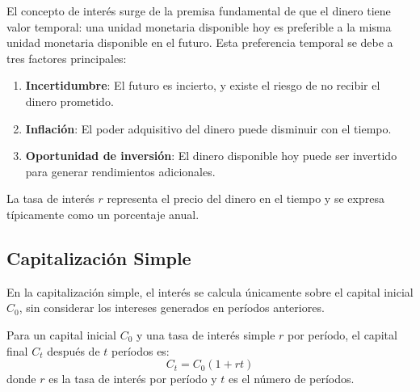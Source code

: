 El concepto de interés surge de la premisa fundamental de que el dinero tiene valor temporal: una unidad monetaria disponible hoy es preferible a la misma unidad monetaria disponible en el futuro. Esta preferencia temporal se debe a tres factores principales:

\begin{enumerate}
\item \textbf{Incertidumbre}: El futuro es incierto, y existe el riesgo de no recibir el dinero prometido.
\item \textbf{Inflación}: El poder adquisitivo del dinero puede disminuir con el tiempo.
\item \textbf{Oportunidad de inversión}: El dinero disponible hoy puede ser invertido para generar rendimientos adicionales.
\end{enumerate}

La tasa de interés $r$ representa el precio del dinero en el tiempo y se expresa típicamente como un porcentaje anual.

\begin{center}
    
\end{center}

\subsection{Capitalización Simple}

En la capitalización simple, el interés se calcula únicamente sobre el capital inicial $C_0$, sin considerar los intereses generados en períodos anteriores.

\begin{teorema}
Para un capital inicial $C_0$ y una tasa de interés simple $r$ por período, el capital final $C_t$ después de $t$ períodos es:
\begin{equation}
C_t = C_0(1 + rt)
\end{equation}
donde $r$ es la tasa de interés por período y $t$ es el número de períodos.
\end{teorema}

\begin{center}
    
\end{center}


